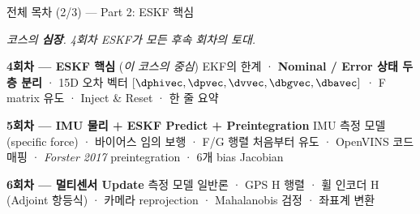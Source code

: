\begin{frame}{전체 목차 (2/3) — Part 2: ESKF 핵심}
  \begin{center}\small\itshape
    \color{gray} 코스의 \textbf{심장}. 4회차 ESKF가 모든 후속 회차의 토대.
  \end{center}
  \vspace{0.6em}

  \begin{alertblock}{\textbf{4회차 — ESKF 핵심} \hfill \scriptsize (\emph{이 코스의 중심})}
    EKF의 한계 · \textbf{Nominal / Error 상태 두 층 분리} ·
    15D 오차 벡터 $[\dphivec, \dpvec, \dvvec, \dbgvec, \dbavec]$ ·
    F matrix 유도 · \alert{Inject \& Reset} · 한 줄 요약
  \end{alertblock}

  \begin{block}{\textbf{5회차 — IMU 물리 + ESKF Predict + Preintegration}}
    IMU 측정 모델 (specific force) · 바이어스 임의 보행 ·
    F/G 행렬 처음부터 유도 · OpenVINS 코드 매핑 ·
    \emph{Forster 2017} preintegration · 6개 bias Jacobian
  \end{block}

  \begin{block}{\textbf{6회차 — 멀티센서 Update}}
    측정 모델 일반론 · GPS H 행렬 · 휠 인코더 H (Adjoint 항등식) ·
    카메라 reprojection · \alert{Mahalanobis 검정} · 좌표계 변환
  \end{block}
\end{frame}

